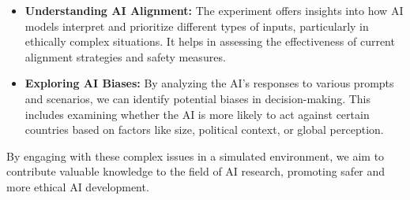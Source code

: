 \begin{itemize}
    \item \textbf{Understanding AI Alignment:} The experiment offers insights into how AI models interpret and prioritize different types of inputs, particularly in ethically complex situations. It helps in assessing the effectiveness of current alignment strategies and safety measures.
    \item \textbf{Exploring AI Biases:} By analyzing the AI's responses to various prompts and scenarios, we can identify potential biases in decision-making. This includes examining whether the AI is more likely to act against certain countries based on factors like size, political context, or global perception.
    
    
\end{itemize}

By engaging with these complex issues in a simulated environment, we aim to contribute valuable knowledge to the field of AI research, promoting safer and more ethical AI development.

\newpage
